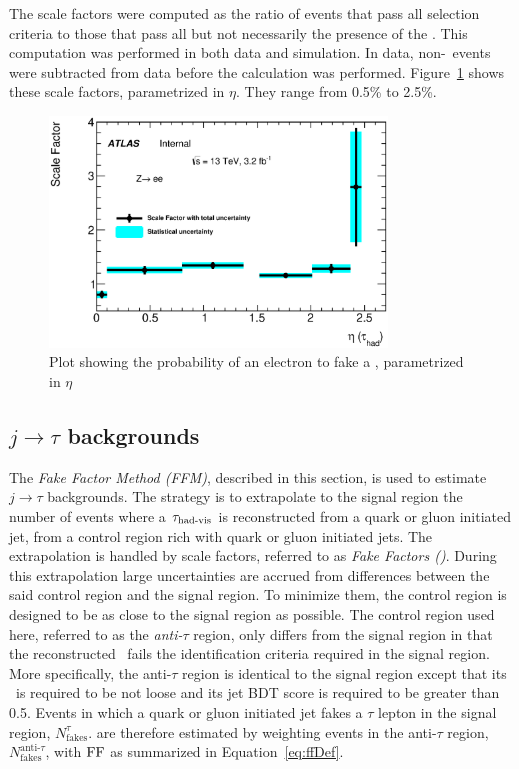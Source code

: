 \par The scale factors were computed as the ratio of events that pass all selection criteria to those 
that pass all but not necessarily the presence of the \tauvis. This computation was 
performed in both data and simulation. In data, non-\Zee\ events were subtracted from data 
before the calculation was performed. Figure~\ref{fig:lepToTau} shows these scale factors, 
parametrized in $\eta$. They range from 0.5\% to 2.5\%.    

\begin{figure}[h]
\centering
   \includegraphics[width=0.8\textwidth]{figures/c7_evto_SF.eps}
\caption{Plot showing the probability of an electron to fake a \tauvis, parametrized in $\eta$}
\label{fig:lepToTau}
\end{figure}
 
\subsection{$j\to\tau$ backgrounds}
\label{sec:jetToTau}
\par The {\it Fake Factor Method (FFM)}, described in this section, is used to estimate $j\to\tau$ backgrounds. 
The strategy is to extrapolate to the signal region the number of events where a $\tau_{\text{had-vis}}$ is reconstructed from a quark 
or gluon initiated jet, from a control region rich with quark or gluon initiated jets.
The extrapolation is handled by scale factors, referred to as {\it Fake Factors (\FF)}. 
During this extrapolation large uncertainties are accrued from differences between the said control region and 
the signal region. To minimize them, the control region is designed to be as close to the 
signal region as possible. The control region used here, referred to as 
the {\it anti-$\tau$} region, only differs from the signal region in that the reconstructed  
 \tauvis\ fails the identification criteria required in the signal region.  
More specifically, the anti-$\tau$ region is identical to the signal region except that its \tauvis\ is required 
to be not loose and its jet BDT score is required to be greater than 0.5.
Events in which a quark or gluon initiated jet fakes a $\tau$ lepton in the signal region, $N^\tau_{\text{fakes}}$.
are therefore estimated by weighting events in the anti-$\tau$ region, $N^{\text{anti-}\tau}_{\text{fakes}}$,
 with $\text{FF}$ as summarized in Equation~\ref{eq:ffDef}. 


